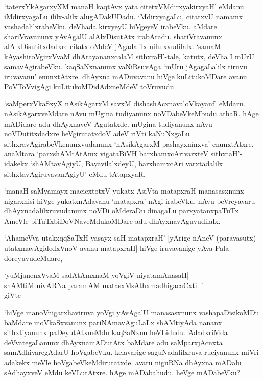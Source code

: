 `taterxYkAgarxyXM manaH kaqtAvx yata citetxVMdirxyakirxyaH' eMdanu. iMdirxyagaLu ililx-alilx alugADakUDadu. iMdirxyagaLu, citatxvU namamx vashadalilxrabeVku. deVhada kirxyeyU hiVgeyeV irabeVku. aMdare shariVravanunx yAvAgalU alAlxDisutAtx irabAradu. shariVravanunx alAlxDisutitxdadxre citatx oMdeV jAgadalilx nilulxvudilalx. `samaM kAyashiroVgirxVvaM dhArayananxcalaM sithxraH'-tale, katutx, deVha I mUrU samavAgirabeVku. kaqSaNxnanunx vaNiRsuvAga `mUru jAgagaLalilx tiruvu iruvavanu' enunxtAtxre. dhAyxna mADuvavanu hiVge kuLitukoMDare avanu PoVToVvigAgi kuLitukoMDidAdxneMdeV toVruvudu.

`saMperxVkaSxyX nAsikAgarxM savxM dishashAcxnavaloVkayanf' eMdaru. nAsikAgarxveMdare nAvu mUgina tudiyanunx noVDabeVkeMbudu athaR. hAge mADidare adu dhAyxnaveV Agutatxde. mUgina tudiyanunx nAvu noVDutitxdadxre heVgirutatxdoV adeV riVti kaNuNxgaLu sithxravAgirabeVkenunxvudanunx `nAsikAgarxM pashayxninxva' enunxtAtxre. anaMtara `parxshAMtAtAmx vigataBiVH barxhamxcArivarxteV sithxtaH'-idakekx `shAMtavAgiyU, BayavilalxdeyU, barxhamxcAri varxtadalilx sithxtavAgiruvavanAgiyU' eMdu tAtapxyaR.

`manaH saMyamayx macicxtotxV yukatx AsiVta matapxraH-manasasxnunx nigarxhisi hiVge yukatxnAdavanu `matapxra' nAgi irabeVku. nAvu beVreyavaru dhAyxnadalilxruvudanunx noVDi oMderaDu dinagaLu parxyatanxpaTuTx AmeVle biTuTxbiDoVNaveMdukoMDare adu dhAyxnavAguvudilalx.

`AhameVva utakxqqSaTxH yasayx saH matapxraH' [yArige nAneV (paravasutx) utatxmavAgidedxVnoV avanu matapxraH] hiVge iruvavanige yAva Pala doreyuvudeMdare,

\begin{shloka}
`yuMjanenxVvaM sadA\s \s tAmxnaM yoVgiV niyatamAnasaH|\\
shAMtiM nivARNa paramAM matasxMsAthxmadhigacaCxti||'\\
\hfill{giVte-}
\end{shloka}

`hiVge manoVnigarxhaviruva yoVgi yAvAgalU manasasxnunx vashapaDisikoMDu baMdare moVkaSxvanunx pariNAmavAguLaLx shAMtiyAda nananx sithxtiyanunx paDeyutAtxneMdu kaqSaNxnu heVLidudu. AdadxriMda deVvategaLanunx dhAyxnamADutAtx baMdare adu saMparxjAcnxta samAdhivaregAdarU hoVgabeVku. kelavarige saguNadalilxruva ruciyanunx miVri adakekx meVle hoVgabeVkeMdirutatxde. avaru niguRNa dhAyxna mADalu sAdhayxveV eMdu keVLutAtxre. hAge mADabahudu. heVge mADabeVku?

